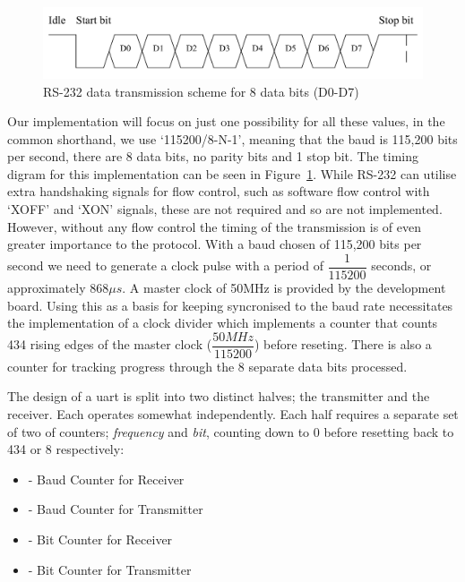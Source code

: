 \begin{figure}
  \centering
  \includegraphics[scale=0.5]{images/rs232}
  \caption{RS-232 data transmission scheme for 8 data bits (D0-D7)}
  \label{fig:rs232}
\end{figure}

Our implementation will focus on just one possibility for all these values,
in the common shorthand, we use `115200/8-N-1', meaning that
the baud is 115,200 bits per second, there are 8 data bits, no parity bits
and 1 stop bit. The timing digram for this implementation can be seen in Figure~\ref{fig:rs232}.
While RS-232 can utilise extra handshaking signals for flow control, such as software
flow control with `XOFF' and `XON' signals,
these are not required and so are not implemented.
However, without
any flow control the timing of the transmission is of even greater importance
to the protocol. With a baud chosen of 115,200 bits per second we need to generate
a clock pulse with a period of $\dfrac{1}{115200}$ seconds, or approximately
$868 \mu s$. A master clock of 50MHz is provided by the development board.
Using this as a basis for keeping syncronised to the baud rate necessitates the
implementation of a clock divider which implements a counter
that counts 434 rising edges of the master clock ($\dfrac{50MHz}{115200}$)
before reseting. There is also a counter for tracking progress through the 8
separate data bits processed.

The design of a \gls{uart} is split into two distinct halves; the transmitter
and the receiver. Each operates somewhat independently.
Each half requires a separate set of two of counters; \emph{frequency} and \emph{bit},
counting down to 0 before resetting back to 434 or 8 respectively:
\begin{itemize}
  \item {} - Baud Counter for Receiver
  \item {} - Baud Counter for Transmitter
  \item {} - Bit Counter for Receiver
  \item {} - Bit Counter for Transmitter
\end{itemize}

